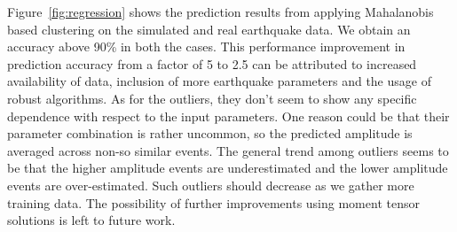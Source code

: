 \documentclass[preprint, aps, showpacs]{revtex4-1}
\newcommand{\rednote}[1]{{\color{red} (#1)}}
\begin{document}
Figure~\ref{fig:regression} shows the prediction results from applying Mahalanobis based clustering on the simulated and real earthquake data. We obtain an accuracy above 90\% in both the cases. This performance improvement in prediction accuracy from a factor of 5 to 2.5 can be attributed to increased availability of data, inclusion of more earthquake parameters and the usage of robust algorithms.  As for the outliers, they don't seem to show any specific dependence with respect to the input parameters. One reason could be that their parameter combination is rather uncommon, so the predicted amplitude is averaged across non-so similar events. The general trend among outliers seems to be that the higher amplitude events are underestimated and the lower amplitude events are over-estimated. Such outliers should decrease as we gather more training data. The possibility of further improvements using moment tensor solutions is left to future work.

\end{document}
